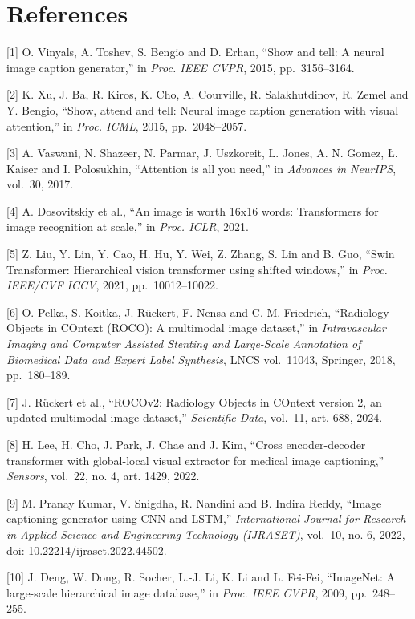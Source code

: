\chapter*{References}

{[}1{]} O. Vinyals, A. Toshev, S. Bengio and D. Erhan, ``Show and tell: A neural image caption generator,'' in \emph{Proc. IEEE CVPR}, 2015, pp.~3156--3164.

{[}2{]} K. Xu, J. Ba, R. Kiros, K. Cho, A. Courville, R. Salakhutdinov, R. Zemel and Y. Bengio, ``Show, attend and tell: Neural image caption generation with visual attention,'' in \emph{Proc. ICML}, 2015, pp.~2048--2057.

{[}3{]} A. Vaswani, N. Shazeer, N. Parmar, J. Uszkoreit, L. Jones, A. N. Gomez, Ł. Kaiser and I. Polosukhin, ``Attention is all you need,'' in \emph{Advances in NeurIPS}, vol.~30, 2017.

{[}4{]} A. Dosovitskiy et al., ``An image is worth 16x16 words: Transformers for image recognition at scale,'' in \emph{Proc. ICLR}, 2021.

{[}5{]} Z. Liu, Y. Lin, Y. Cao, H. Hu, Y. Wei, Z. Zhang, S. Lin and B. Guo, ``Swin Transformer: Hierarchical vision transformer using shifted windows,'' in \emph{Proc. IEEE/CVF ICCV}, 2021, pp.~10012--10022.

{[}6{]} O. Pelka, S. Koitka, J. Rückert, F. Nensa and C. M. Friedrich, ``Radiology Objects in COntext (ROCO): A multimodal image dataset,'' in \emph{Intravascular Imaging and Computer Assisted Stenting and Large-Scale Annotation of Biomedical Data and Expert Label Synthesis}, LNCS vol.~11043, Springer, 2018, pp.~180--189.

{[}7{]} J. Rückert et al., ``ROCOv2: Radiology Objects in COntext version 2, an updated multimodal image dataset,'' \emph{Scientific Data}, vol.~11, art. 688, 2024.

{[}8{]} H. Lee, H. Cho, J. Park, J. Chae and J. Kim, ``Cross encoder-decoder transformer with global-local visual extractor for medical image captioning,'' \emph{Sensors}, vol.~22, no. 4, art. 1429, 2022.

{[}9{]} M. Pranay Kumar, V. Snigdha, R. Nandini and B. Indira Reddy, ``Image captioning generator using CNN and LSTM,'' \emph{International Journal for Research in Applied Science and Engineering Technology (IJRASET)}, vol.~10, no. 6, 2022, doi: 10.22214/ijraset.2022.44502.

{[}10{]} J. Deng, W. Dong, R. Socher, L.-J. Li, K. Li and L. Fei-Fei, ``ImageNet: A large-scale hierarchical image database,'' in \emph{Proc. IEEE CVPR}, 2009, pp.~248--255.


